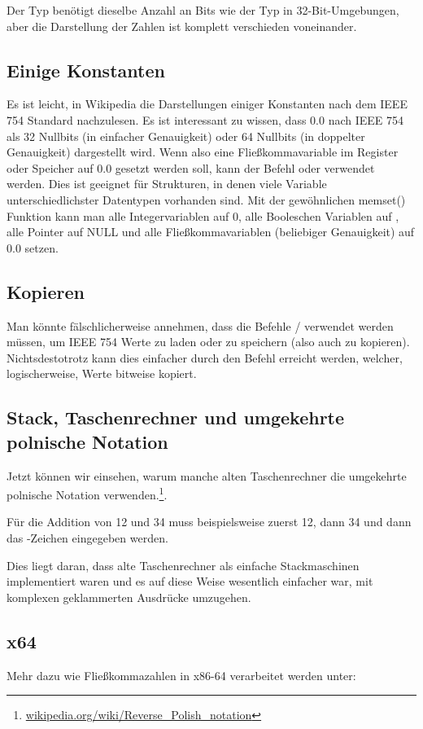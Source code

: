 Der \Tfloat Typ benötigt dieselbe Anzahl an Bits wie der \Tint Typ in
32-Bit-Umgebungen, aber die Darstellung der Zahlen ist komplett verschieden
voneinander.





\subsection{Einige Konstanten}
Es ist leicht, in Wikipedia die Darstellungen einiger Konstanten nach dem IEEE
754 Standard nachzulesen. Es ist interessant zu wissen, dass 0.0 nach IEEE 754
als 32 Nullbits (in einfacher Genauigkeit) oder 64 Nullbits (in doppelter
Genauigkeit) dargestellt wird.
Wenn also eine Fließkommavariable im Register oder Speicher auf 0.0 gesetzt
werden soll, kann der Befehl \MOV oder  verwendet werden.
Dies ist geeignet für Strukturen, in denen viele Variable unterschiedlichster
Datentypen vorhanden sind. Mit der gewöhnlichen memset() Funktion kann man alle
Integervariablen auf 0, alle Booleschen Variablen auf , alle Pointer
auf NULL und alle Fließkommavariablen (beliebiger Genauigkeit) auf 0.0 setzen.

\subsection{Kopieren}
Man könnte fälschlicherweise annehmen, dass die Befehle /
verwendet werden müssen, um IEEE 754 Werte zu laden oder zu speichern (also
auch zu kopieren). Nichtsdestotrotz kann dies einfacher durch den Befehl
 erreicht werden, welcher, logischerweise, Werte bitweise kopiert.

\subsection{Stack, Taschenrechner und umgekehrte polnische Notation}

Jetzt können wir einsehen, warum manche alten Taschenrechner die umgekehrte
polnische Notation verwenden.\footnote{\href{http://go.yurichev.com/17354}{wikipedia.org/wiki/Reverse\_Polish\_notation}}.

Für die Addition von 12 und 34 muss beispielsweise zuerst 12, dann 34 und dann
das -Zeichen eingegeben werden. 

Dies liegt daran, dass alte Taschenrechner als einfache Stackmaschinen
implementiert waren und es auf diese Weise wesentlich einfacher war, mit
komplexen geklammerten Ausdrücke umzugehen.


\subsection{x64}
Mehr dazu wie Fließkommazahlen in x86-64 verarbeitet werden unter:


